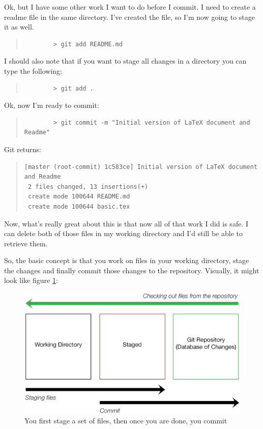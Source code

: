 Ok, but I have some other work I want to do before I commit.  I need to create a readme file in the same directory.  I've created the file, so I'm now going to stage it as well.

\begin{quote}
	\begin{verbatim}
		> git add README.md
	\end{verbatim}
\end{quote}

I should also note that if you want to stage all changes in a directory you can type the following:

\begin{quote}
	\begin{verbatim}
		> git add .
	\end{verbatim}
\end{quote}

Ok, now I'm ready to commit:

\begin{quote}
	\begin{verbatim}
		> git commit -m "Initial version of LaTeX document and Readme"
	\end{verbatim}
\end{quote}

Git returns:

\begin{quote}
	\begin{verbatim}
[master (root-commit) 1c583ce] Initial version of LaTeX document and Readme
 2 files changed, 13 insertions(+)
 create mode 100644 README.md
 create mode 100644 basic.tex
	\end{verbatim}
\end{quote}

Now, what's really great about this is that now all of that work I did is safe.  I can delete both of those files in my working directory and I'd still be able to retrieve them.

So, the basic concept is that you work on files in your working directory, stage the changes and finally commit those changes to the repository.  Visually, it might look like figure \ref{fig:diagram}:

\begin{figure}[h]
	\centering
  	\includegraphics[width=6in]{graphics/diagram.eps}
  	\caption{You first stage a set of files, then once you are done, you commit}
  	\label{fig:diagram}
\end{figure}

